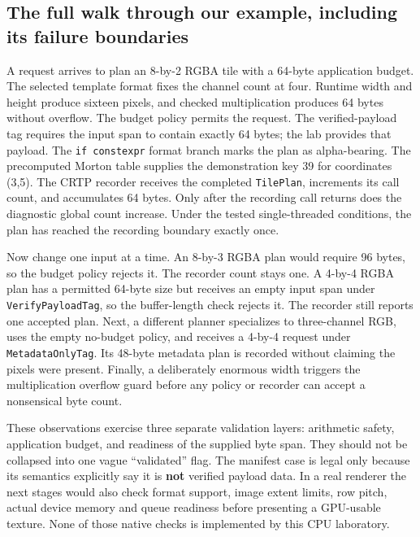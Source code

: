 \subsection{The full walk through our example, including its failure boundaries}\label{01-foundations-i-ch005-the-full-walk-through-our-example-including-its-failure-boundaries}

A request arrives to plan an 8-by-2 RGBA tile with a 64-byte application budget. The selected template format fixes the channel count at four. Runtime width and height produce sixteen pixels, and checked multiplication produces 64 bytes without overflow. The budget policy permits the request. The verified-payload tag requires the input span to contain exactly 64 bytes; the lab provides that payload. The \texttt{if\ constexpr} format branch marks the plan as alpha-bearing. The precomputed Morton table supplies the demonstration key 39 for coordinates (3,5). The CRTP recorder receives the completed \texttt{TilePlan}, increments its call count, and accumulates 64 bytes. Only after the recording call returns does the diagnostic global count increase. Under the tested single-threaded conditions, the plan has reached the recording boundary exactly once.

Now change one input at a time. An 8-by-3 RGBA plan would require 96 bytes, so the budget policy rejects it. The recorder count stays one. A 4-by-4 RGBA plan has a permitted 64-byte size but receives an empty input span under \texttt{VerifyPayloadTag}, so the buffer-length check rejects it. The recorder still reports one accepted plan. Next, a different planner specializes to three-channel RGB, uses the empty no-budget policy, and receives a 4-by-4 request under \texttt{MetadataOnlyTag}. Its 48-byte metadata plan is recorded without claiming the pixels were present. Finally, a deliberately enormous width triggers the multiplication overflow guard before any policy or recorder can accept a nonsensical byte count.

These observations exercise three separate validation layers: arithmetic safety, application budget, and readiness of the supplied byte span. They should not be collapsed into one vague ``validated'' flag. The manifest case is legal only because its semantics explicitly say it is \textbf{not} verified payload data. In a real renderer the next stages would also check format support, image extent limits, row pitch, actual device memory and queue readiness before presenting a GPU-usable texture. None of those native checks is implemented by this CPU laboratory.

